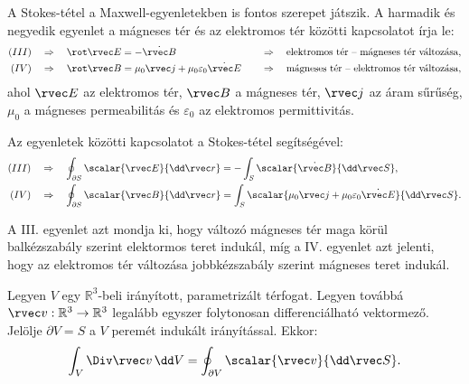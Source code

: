 \documentclass[a4paper, 12pt]{scrartcl}
\begin{document}
\begin{learnMore}
  A Stokes-tétel a Maxwell-egyenletekben is fontos szerepet játszik. A harmadik
  és negyedik egyenlet a mágneses tér és az elektromos tér közötti
  kapcsolatot írja le:
  $$
    \begin{aligned}
      (III) & \quad \Rightarrow \quad \rot \rvec E = -\dot{\rvec B}
            &
            & \quad \Rightarrow \quad \text{elektromos tér -- mágneses tér változása,}
      \\
      (IV)  & \quad \Rightarrow \quad \rot \rvec B = \mu_0 \rvec j + \mu_0
      \varepsilon_0 \dot{\rvec E}
            &
            & \quad \Rightarrow \quad \text{mágneses tér -- elektromos tér változása,}
    \end{aligned}
  $$
  ahol $\rvec E$ az elektromos tér, $\rvec B$ a mágneses tér, $\rvec j$ az áram
  sűrűség, $\mu_0$ a mágneses permeabilitás és $\varepsilon_0$ az elektromos
  permittivitás.

  Az egyenletek közötti kapcsolatot a Stokes-tétel segítségével:
  $$
    \begin{aligned}
      (III) & \quad \Rightarrow \quad
      \oint_{\partial S} \scalar{\rvec E}{\dd \rvec r}
      = -\int_S \scalar{\dot{\rvec B}}{\dd \rvec S}
      \text,
      \\
      (IV)  & \quad \Rightarrow \quad
      \oint_{\partial S} \scalar{\rvec B}{\dd \rvec r}
      = \int_S \scalar{\mu_0 \rvec j + \mu_0 \varepsilon_0 \dot{\rvec E}}{\dd \rvec S}
      \text.
    \end{aligned}
  $$

  A III. egyenlet azt mondja ki, hogy változó mágneses tér maga körül
  balkézszabály szerint elektormos teret indukál, míg a IV. egyenlet azt
  jelenti, hogy az elektromos tér változása jobbkézszabály szerint
  mágneses teret indukál.
\end{learnMore}

\begin{theorem}
  Legyen $V$ egy $\mathbb R^3$-beli irányított, parametrizált térfogat. Legyen
  továbbá $\rvec v : \mathbb R^3 \rightarrow \mathbb R^3$ legalább egyszer
  folytonosan differenciálható vektormező. Jelölje $\partial V = S$ a $V$
  peremét indukált irányítással. Ekkor:
  $$
    \int_V \Div \rvec v \, \dd V
    =
    \oint_{\partial V} \scalar{\rvec v}{\dd \rvec S}
    \text.
  $$
\end{theorem}
\end{document}
